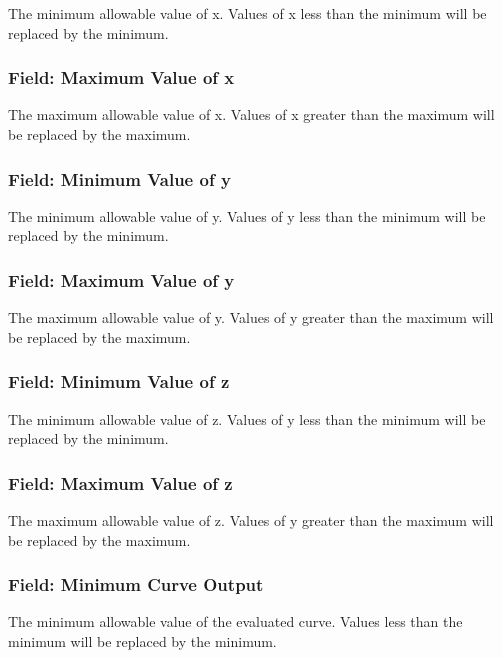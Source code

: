 The minimum allowable value of x. Values of x less than the minimum will be replaced by the minimum.

\subsubsection{Field: Maximum Value of x}\label{field-maximum-value-of-x-10}

The maximum allowable value of x. Values of x greater than the maximum will be replaced by the maximum.

\subsubsection{Field: Minimum Value of y}\label{field-minimum-value-of-y-4}

The minimum allowable value of y. Values of y less than the minimum will be replaced by the minimum.

\subsubsection{Field: Maximum Value of y}\label{field-maximum-value-of-y-4}

The maximum allowable value of y. Values of y greater than the maximum will be replaced by the maximum.

\subsubsection{Field: Minimum Value of z}\label{field-minimum-value-of-z-1}

The minimum allowable value of z. Values of y less than the minimum will be replaced by the minimum.

\subsubsection{Field: Maximum Value of z}\label{field-maximum-value-of-z-1}

The maximum allowable value of z. Values of y greater than the maximum will be replaced by the maximum.

\subsubsection{Field: Minimum Curve Output}\label{field-minimum-curve-output-8}

The minimum allowable value of the evaluated curve. Values less than the minimum will be replaced by the minimum.


